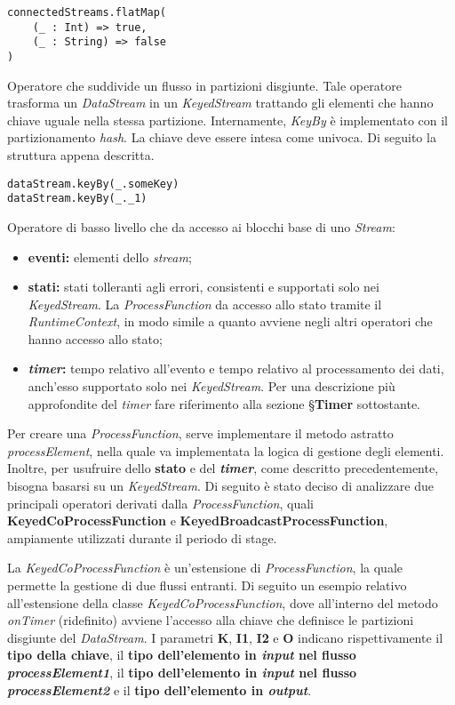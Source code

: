 \begin{verbatim}
connectedStreams.flatMap(
    (_ : Int) => true,
    (_ : String) => false
)
\end{verbatim}

Operatore che suddivide un flusso in partizioni disgiunte. Tale operatore trasforma un \textit{DataStream} in un \textit{KeyedStream} trattando gli elementi che hanno chiave uguale nella stessa partizione. Internamente, \textit{KeyBy} è implementato con il partizionamento \textit{hash}.
La chiave deve essere intesa come univoca.
Di seguito la struttura appena descritta.
\begin{verbatim}
dataStream.keyBy(_.someKey)
dataStream.keyBy(_._1)
\end{verbatim}

Operatore di basso livello che da accesso ai blocchi base di uno \textit{Stream}:
\begin{itemize}
	\item{\textbf{eventi:} elementi dello \textit{stream};}
	\item{\textbf{stati:} stati tolleranti agli errori, consistenti e supportati solo nei \textit{KeyedStream}. La \textit{ProcessFunction} da accesso allo stato tramite il \textit{RuntimeContext}, in modo simile a quanto avviene negli altri operatori che hanno accesso allo stato;}
	\item{\textbf{\textit{timer}:} tempo relativo all'evento e tempo relativo al processamento dei dati, anch'esso supportato solo nei \textit{KeyedStream}. Per una descrizione più approfondite del \textit{timer} fare riferimento alla sezione \S\textbf{Timer} sottostante.}
\end{itemize}

Per creare una \textit{ProcessFunction}, serve implementare il metodo astratto \textit{processElement}, nella quale va implementata la logica di gestione degli elementi. Inoltre, per usufruire dello \textbf{stato} e del \textbf{\textit{timer}}, come descritto precedentemente, bisogna basarsi su un \textit{KeyedStream}. Di seguito è stato deciso di analizzare due principali operatori derivati dalla \textit{ProcessFunction}, quali \textbf{KeyedCoProcessFunction} e \textbf{KeyedBroadcastProcessFunction}, ampiamente utilizzati durante il periodo di stage.

La \textit{KeyedCoProcessFunction} è un'estensione di \textit{ProcessFunction}, la quale permette la gestione di due flussi entranti. Di seguito un esempio relativo all'estensione della classe \textit{KeyedCoProcessFunction}, dove all'interno del metodo \textit{onTimer} (ridefinito) avviene l'accesso alla chiave che definisce le partizioni disgiunte del \textit{DataStream}. I parametri \textbf{K}, \textbf{I1}, \textbf{I2} e \textbf{O} indicano rispettivamente il \textbf{tipo della chiave}, il \textbf{tipo dell'elemento in \textit{input} nel flusso \textit{processElement1}}, il \textbf{tipo dell'elemento in \textit{input} nel flusso \textit{processElement2}} e il \textbf{tipo dell'elemento in \textit{output}}.

